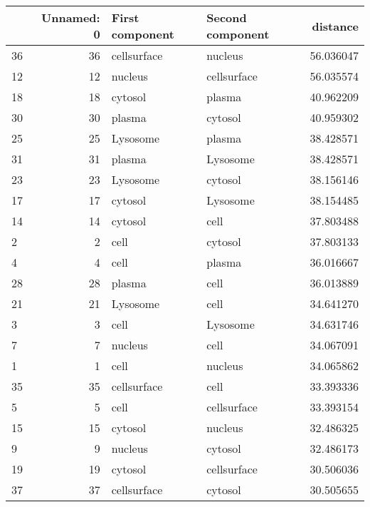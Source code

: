 \begin{tabular}{lrllr}
\toprule
{} &  Unnamed: 0 & First component & Second component &   distance \\
\midrule
36 &          36 &     cellsurface &          nucleus &  56.036047 \\
12 &          12 &         nucleus &      cellsurface &  56.035574 \\
18 &          18 &         cytosol &           plasma &  40.962209 \\
30 &          30 &          plasma &          cytosol &  40.959302 \\
25 &          25 &        Lysosome &           plasma &  38.428571 \\
31 &          31 &          plasma &         Lysosome &  38.428571 \\
23 &          23 &        Lysosome &          cytosol &  38.156146 \\
17 &          17 &         cytosol &         Lysosome &  38.154485 \\
14 &          14 &         cytosol &             cell &  37.803488 \\
2  &           2 &            cell &          cytosol &  37.803133 \\
4  &           4 &            cell &           plasma &  36.016667 \\
28 &          28 &          plasma &             cell &  36.013889 \\
21 &          21 &        Lysosome &             cell &  34.641270 \\
3  &           3 &            cell &         Lysosome &  34.631746 \\
7  &           7 &         nucleus &             cell &  34.067091 \\
1  &           1 &            cell &          nucleus &  34.065862 \\
35 &          35 &     cellsurface &             cell &  33.393336 \\
5  &           5 &            cell &      cellsurface &  33.393154 \\
15 &          15 &         cytosol &          nucleus &  32.486325 \\
9  &           9 &         nucleus &          cytosol &  32.486173 \\
19 &          19 &         cytosol &      cellsurface &  30.506036 \\
37 &          37 &     cellsurface &          cytosol &  30.505655 \\

\end{tabular}
